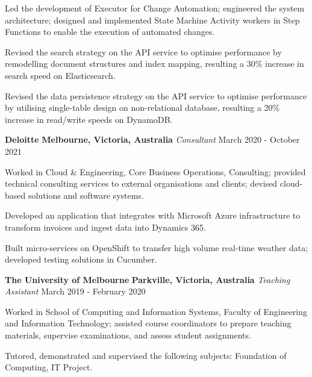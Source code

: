 \documentclass{cv}
\begin{document}
\begin{list}{}{\setlength{\leftmargin}{0pt}}
\begin{list}{\raisebox{2.0pt}{\tiny$\bullet$}\space}{\setlength{\leftmargin}{11.2pt}}
        \item Led the development of Executor for Change Automation; engineered the system architecture; designed and implemented State Machine Activity workers in Step Functions to enable the execution of automated changes.
        \item Revised the search strategy on the API service to optimise performance by remodelling document structures and index mapping, resulting a 30\% increase in search speed on Elasticsearch.
        \item Revised the data persistence strategy on the API service to optimise performance by utilising single-table design on non-relational database, resulting a 20\% increase in read/write speeds on DynamoDB.
    \end{list}
\item
    \textbf{Deloitte} \hfill \textbf{Melbourne, Victoria, Australia}%
    \vspace{1.0pt} \newline 
    {\textit{Consultant}} \hfill {March 2020 - October 2021}%
    \begin{list}{\raisebox{2.0pt}{\tiny$\bullet$}\space}{\setlength{\leftmargin}{11.2pt}}
        \itemsep -4.0pt \vspace{-4.0pt}
        \item Worked in Cloud \& Engineering, Core Business Operations, Consulting; provided technical consulting services to external organisations and clients; devised cloud-based solutions and software systems.
        \item Developed an application that integrates with Microsoft Azure infrastructure to transform invoices and ingest data into Dynamics 365.
        \item Built micro-services on OpenShift to transfer high volume real-time weather data; developed testing solutions in Cucumber.
    \end{list}
\item
    \textbf{The University of Melbourne} \hfill \textbf{Parkville, Victoria, Australia}%
    \vspace{1.0pt} \newline 
    {\textit{Teaching Assistant}} \hfill {March 2019 - February 2020}%
    \begin{list}{\raisebox{2.0pt}{\tiny$\bullet$}\space}{\setlength{\leftmargin}{11.2pt}}
        \itemsep -4.0pt \vspace{-4.0pt}
        \item Worked in School of Computing and Information Systems, Faculty of Engineering and Information Technology; assisted course coordinators to prepare teaching materials, supervise examinations, and assess student assignments.
        \item Tutored, demonstrated and supervised the following subjects: Foundation of Computing, IT Project.
    \end{list}
\end{list}

\end{document}
